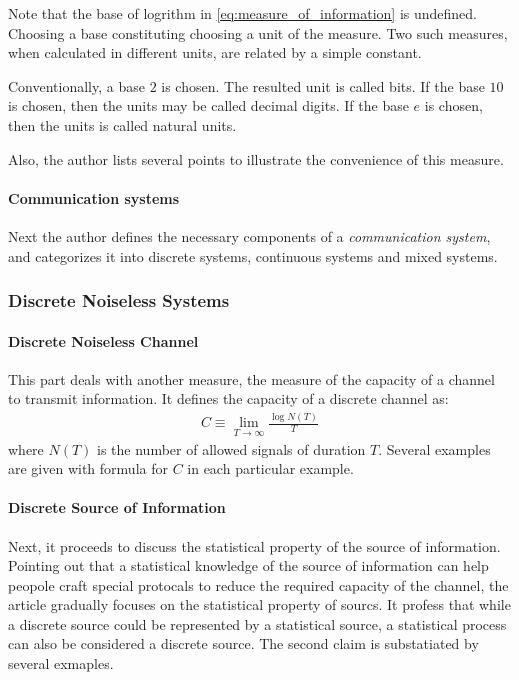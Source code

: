 Note that the base of logrithm in \ref{eq:measure_of_information}
is undefined. Choosing a base constituting choosing a unit of
the measure. Two such measures, when calculated in different units,
are related by a simple constant.

Conventionally, a base $2$ is chosen. The resulted unit is called
bits. If the base $10$ is chosen, then the units may be called
decimal digits. If the base $e$ is chosen, then the units is
called natural units.

Also, the author lists several points to illustrate the
convenience of this measure.

\paragraph{Communication systems}
Next the author defines the necessary components of a \textit{
   	communication system}, and categorizes it into discrete systems,
continuous systems and mixed systems.

\subsubsection{Discrete Noiseless Systems}

\paragraph{Discrete Noiseless Channel}
\label{sec:Discrete Noiseless Channel}
This part deals with another measure, the measure of the capacity
of a channel to transmit information. It defines the capacity of a
discrete channel as:
\begin{align}
\label{eq:capacity_of_disc_chan}
C\equiv \lim_{T\to \infty} \frac{\log N(T)}{T}
\end{align}
where $N(T)$ is the number of allowed signals of duration $T$.
Several examples are given with formula for $C$ in each particular
example.

\paragraph{Discrete Source of Information}
Next, it proceeds to discuss the statistical property of the source
of information. Pointing out that a statistical knowledge of the
source of information can help peopole craft special protocals to
reduce the required capacity of the channel, the article gradually
focuses on the statistical property of sourcs. It profess that while a
discrete source could be represented by a statistical source, a
statistical process can also be considered a discrete source. The
second claim is substatiated by several exmaples.

